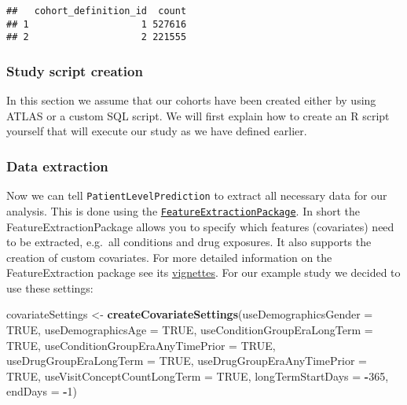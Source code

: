 \documentclass[
]{article}
\newenvironment{Shaded}{\begin{snugshade}}{\end{snugshade}}
\newcommand{\AttributeTok}[1]{\textcolor[rgb]{0.13,0.29,0.53}{#1}}
\newcommand{\ConstantTok}[1]{\textcolor[rgb]{0.56,0.35,0.01}{#1}}
\newcommand{\DecValTok}[1]{\textcolor[rgb]{0.00,0.00,0.81}{#1}}
\newcommand{\FunctionTok}[1]{\textcolor[rgb]{0.13,0.29,0.53}{\textbf{#1}}}
\newcommand{\NormalTok}[1]{#1}
\newcommand{\OtherTok}[1]{\textcolor[rgb]{0.56,0.35,0.01}{#1}}
\newcommand{\SpecialCharTok}[1]{\textcolor[rgb]{0.81,0.36,0.00}{\textbf{#1}}}
\begin{document}
\begin{verbatim}
##   cohort_definition_id  count
## 1                    1 527616
## 2                    2 221555
\end{verbatim}

\hypertarget{study-script-creation}{%
\subsubsection{Study script creation}\label{study-script-creation}}

In this section we assume that our cohorts have been created either by
using ATLAS or a custom SQL script. We will first explain how to create
an R script yourself that will execute our study as we have defined
earlier.

\hypertarget{data-extraction}{%
\subsubsection{Data extraction}\label{data-extraction}}

Now we can tell \texttt{PatientLevelPrediction} to extract all necessary
data for our analysis. This is done using the
\href{https://github.com/OHDSI/FeatureExtraction}{\texttt{FeatureExtractionPackage}}.
In short the FeatureExtractionPackage allows you to specify which
features (covariates) need to be extracted, e.g.~all conditions and drug
exposures. It also supports the creation of custom covariates. For more
detailed information on the FeatureExtraction package see its
\href{https://github.com/OHDSI/FeatureExtraction}{vignettes}. For our
example study we decided to use these settings:

\begin{Shaded}
\begin{Highlighting}[]
\NormalTok{  covariateSettings }\OtherTok{\textless{}{-}} \FunctionTok{createCovariateSettings}\NormalTok{(}\AttributeTok{useDemographicsGender =} \ConstantTok{TRUE}\NormalTok{,}
  \AttributeTok{useDemographicsAge =} \ConstantTok{TRUE}\NormalTok{,}
  \AttributeTok{useConditionGroupEraLongTerm =} \ConstantTok{TRUE}\NormalTok{,}
  \AttributeTok{useConditionGroupEraAnyTimePrior =} \ConstantTok{TRUE}\NormalTok{,}
  \AttributeTok{useDrugGroupEraLongTerm =} \ConstantTok{TRUE}\NormalTok{,}
  \AttributeTok{useDrugGroupEraAnyTimePrior =} \ConstantTok{TRUE}\NormalTok{,}
  \AttributeTok{useVisitConceptCountLongTerm =} \ConstantTok{TRUE}\NormalTok{,}
  \AttributeTok{longTermStartDays =} \SpecialCharTok{{-}}\DecValTok{365}\NormalTok{,}
  \AttributeTok{endDays =} \SpecialCharTok{{-}}\DecValTok{1}\NormalTok{)}
\end{Highlighting}
\end{Shaded}
\end{document}

